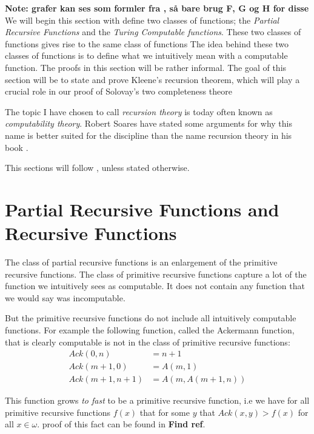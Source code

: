 \documentclass[../main.tex]{subfiles}
\begin{document}
\textbf{Note: grafer kan ses som formler fra \PRA, så bare brug F, G og H for
disse}
We will begin this section with define two classes of functions;
the \textit{Partial Recursive Functions} and  the \textit{Turing Computable
functions}. These two classes of functions gives rise to the same class of
functions The idea behind these two classes of functions is to define what
we intuitively mean with a computable function. The proofs in this section will
be rather informal. The goal of this section will be to state and prove
Kleene's recursion theorem, which will play a crucial role in our proof of 
Solovay's two  completeness theore

The topic I have chosen to call \textit{recursion theory} is today often known as
\textit{computability theory}. Robert Soares have stated some arguments for why this
name is better suited for the discipline than the name recursion theory in his
book \parencite{Soare2016}.

This sections will follow \parencite{Soare1987}, unless stated otherwise. 

\section{Partial Recursive Functions and Recursive Functions}
The class of partial recursive functions is an enlargement of the primitive recursive
functions. The class of primitive recursive functions capture a lot of the
function we intuitively sees as computable. It does not contain any function that
we would say was incomputable.

But the primitive recursive functions do not include all intuitively computable
functions. For example the following function, called the Ackermann function,  that is clearly computable is not
in the class of primitive recursive functions:
\begin{align*}
	Ack(0,n)&=n+1\\
	Ack(m+1,0)&=A(m,1)\\
	Ack(m+1,n+1)&=A(m,A(m+1,n))
\end{align*}

This function grows \textit{to fast} to be a primitive recursive function, i.e
we have for all primitive recursive functions $f(x)$ that for some $y$ that
$Ack(x,y)>f(x)$ for all $x\in \omega$. 
proof of this fact can be found in \textbf{Find ref}.
\end{document}
